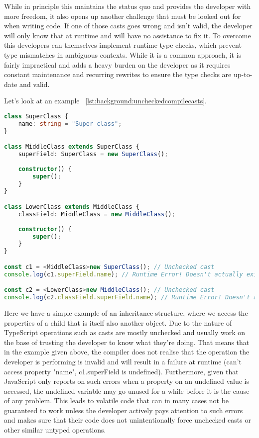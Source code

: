 While in principle this maintains the status quo and provides the developer with more freedom, it also opens up another challenge that must be looked out for when writing code. If one of those casts goes wrong and isn't valid, the developer will only know that at runtime and will have no assistance to fix it. To overcome this developers can themselves implement runtime type checks, which prevent type mismatches in ambiguous contexts. While it is a common approach, it is fairly impractical and adds a heavy burden on the developer as it requires constant maintenance and recurring rewrites to ensure the type checks are up-to-date and valid.

Let's look at an example ~\ref{lst:background:uncheckedcompilecasts}.

\begin{lstlisting}[language=TypeScript,caption=Unchecked compile-time casts in TypeScript,label=lst:background:uncheckedcompilecasts]
class SuperClass {
	name: string = "Super class";
}

class MiddleClass extends SuperClass {
	superField: SuperClass = new SuperClass();
	
	constructor() {
		super();
	}
}

class LowerClass extends MiddleClass {
	classField: MiddleClass = new MiddleClass();
	
	constructor() {
		super();
	}
}

const c1 = <MiddleClass>new SuperClass(); // Unchecked cast
console.log(c1.superField.name); // Runtime Error! Doesn't actually exist

const c2 = <LowerClass>new MiddleClass(); // Unchecked cast
console.log(c2.classField.superField.name); // Runtime Error! Doesn't actually exist
\end{lstlisting}

Here we have a simple example of an inheritance structure, where we access the properties of a child that is itself also another object. Due to the nature of TypeScript operations such as casts are mostly unchecked and usually work on the base of trusting the developer to know what they're doing. That means that in the example given above, the compiler does not realise that the operation the developer is performing is invalid and will result in a failure at runtime (can't access property "name", c1.superField is undefined). Furthermore, given that JavaScript only reports on such errors when a property on an undefined value is accessed, the undefined variable may go unused for a while before it is the cause of any problem. This leads to volatile code that can in many cases not be guaranteed to work unless the developer actively pays attention to such errors and makes sure that their code does not unintentionally force unchecked casts or other similar untyped operations.

